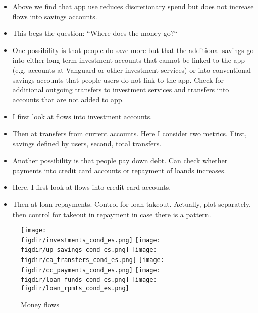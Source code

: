 \begin{itemize}
    \item Above we find that app use reduces discretionary spend but does not
        increase flows into savings accounts.

    \item This begs the question: ``Where does the money go?``

    \item One possibility is that people do save more but that the additional
        savings go into either long-term investment accounts that cannot be
        linked to the app (e.g. accounts at Vanguard or other investment
        services) or into conventional savings accounts that people users do
        not link to the app. Check for additional outgoing transfers to
        investment services and transfers into accounts that are not added to
        app.

    \item I first look at flows into investment accounts.

    \item Then at transfers from current accounts. Here I consider two metrics.
        First, savings defined by users, second, total transfers.

    \item Another possibility is that people pay down debt. Can check whether
        payments into credit card accounts or repayment of loands increases.

    \item Here, I first look at flows into credit card accounts.

    \item Then at loan repayments. Control for loan takeout. Actually, plot
        separately, then control for takeout in repayment in case there is a
        pattern.
\end{itemize}

\begin{figure}[H]
    \centering
    \caption{Money flows}%
    \label{fig:int_ext_results}
    \texttt{[image: \\figdir/investments\_cond\_es.png]}
    \texttt{[image: \\figdir/up\_savings\_cond\_es.png]}
    \texttt{[image: \\figdir/ca\_transfers\_cond\_es.png]}
    \texttt{[image: \\figdir/cc\_payments\_cond\_es.png]}
    \texttt{[image: \\figdir/loan\_funds\_cond\_es.png]}
    \texttt{[image: \\figdir/loan\_rpmts\_cond\_es.png]}
\end{figure}


